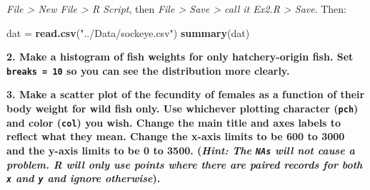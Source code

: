\documentclass[]{book}
\newenvironment{Shaded}{\begin{snugshade}}{\end{snugshade}}
\newcommand{\DataTypeTok}[1]{\textcolor[rgb]{0.13,0.29,0.53}{#1}}
\newcommand{\DecValTok}[1]{\textcolor[rgb]{0.00,0.00,0.81}{#1}}
\newcommand{\FloatTok}[1]{\textcolor[rgb]{0.00,0.00,0.81}{#1}}
\newcommand{\KeywordTok}[1]{\textcolor[rgb]{0.13,0.29,0.53}{\textbf{#1}}}
\newcommand{\NormalTok}[1]{#1}
\newcommand{\OperatorTok}[1]{\textcolor[rgb]{0.81,0.36,0.00}{\textbf{#1}}}
\newcommand{\StringTok}[1]{\textcolor[rgb]{0.31,0.60,0.02}{#1}}
\begin{document}
\emph{File \textgreater{} New File \textgreater{} R Script}, then \emph{File \textgreater{} Save \textgreater{} call it Ex2.R \textgreater{} Save}. Then:

\begin{Shaded}
\begin{Highlighting}[]
\NormalTok{dat =}\StringTok{ }\KeywordTok{read.csv}\NormalTok{(}\StringTok{"../Data/sockeye.csv"}\NormalTok{)}
\KeywordTok{summary}\NormalTok{(dat)}
\end{Highlighting}
\end{Shaded}

\textbf{2. Make a histogram of fish weights for only hatchery-origin fish. Set \texttt{breaks\ =\ 10} so you can see the distribution more clearly.}

\begin{Shaded}
\end{Shaded}

\textbf{3. Make a scatter plot of the fecundity of females as a function of their body weight for wild fish only. Use whichever plotting character (\texttt{pch}) and color (\texttt{col}) you wish. Change the main title and axes labels to reflect what they mean. Change the x-axis limits to be 600 to 3000 and the y-axis limits to be 0 to 3500. (\emph{Hint: The \texttt{NAs} will not cause a problem. R will only use points where there are paired records for both \texttt{x} and \texttt{y} and ignore otherwise}).}

\begin{Shaded}
\end{Shaded}
\end{document}
